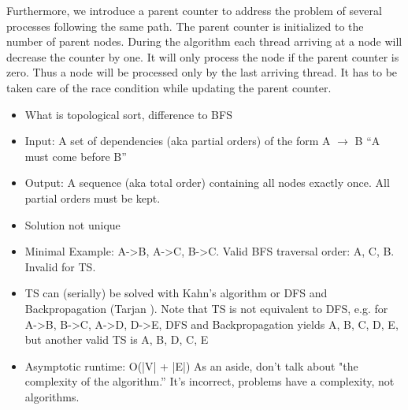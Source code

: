 Furthermore, we introduce a parent counter to address the problem of several processes following the same path. The parent counter is initialized to the number of parent nodes. During the algorithm each thread arriving at a node will decrease the counter by one. It will only process the node if the parent counter is zero. Thus a node will be processed only by the last arriving thread. It has to be taken care of the race condition while updating the parent counter.



 
 
 
 \begin{invisible}
 \begin{itemize}
  \item What is topological sort, difference to BFS
  \item Input: A set of dependencies (aka partial orders) of the form A $\rightarrow$ B ``A must come before B''
  \item Output: A sequence (aka total order) containing all nodes exactly once. All partial orders must be kept.
  \item Solution not unique
  \item Minimal Example: A->B, A->C, B->C. Valid BFS traversal order: A, C, B. Invalid for TS.
  \item TS can (serially) be solved with Kahn's algorithm \cite{kahn1962topological} or DFS and Backpropagation (Tarjan \cite{tarjan1976edge}). %
        Note that TS is not equivalent to DFS, e.g. for A->B, B->C, A->D, D->E, DFS and Backpropagation yields A, B, C, D, E, but another valid TS is A, B, D, C, E
  \item Asymptotic runtime: O(|V| + |E|)
As an aside, don't talk about "the complexity of the algorithm.'' It's incorrect,
problems have a complexity, not algorithms.  
 \end{itemize}


\end{invisible}
